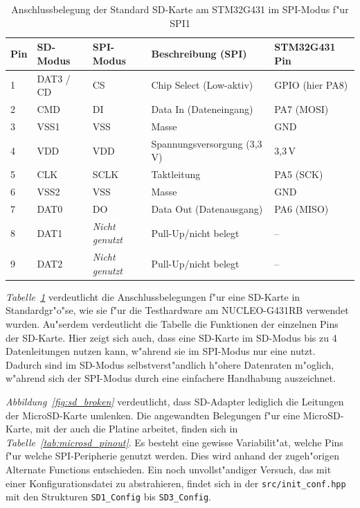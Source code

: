 \documentclass[11pt]{article}
\newcommand*{\tab}[1]{\textit{Tabelle~\ref{#1}}}
\newcommand*{\fig}[1]{\textit{Abbildung~\ref{#1}}}
\newcommand{\cpp}[1]{\texttt{#1}}
\begin{document}
\begin{table}[H]
    \centering
    \caption{Anschlussbelegung der Standard SD-Karte am STM32G431 im SPI-Modus f"ur SPI1}
    \label{tab:standardsd_spi}
    \begin{tabular}{lllll}
    \toprule
    \textbf{Pin} & \textbf{SD-Modus} & \textbf{SPI-Modus} & \textbf{Beschreibung (SPI)} & \textbf{STM32G431 Pin} \\ \midrule
    1            & DAT3 / CD         & CS        & Chip Select (Low-aktiv)     & GPIO (hier PA8)        \\
    2            & CMD               & DI        & Data In (Dateneingang)      & PA7 (MOSI)              \\
    3            & VSS1              & VSS       & Masse                       & GND                     \\
    4            & VDD               & VDD       & Spannungsversorgung (3,3\,V)    & 3,3\,V                  \\
    5            & CLK               & SCLK      & Taktleitung                 & PA5 (SCK)               \\
    6            & VSS2              & VSS       & Masse                       & GND                     \\
    7            & DAT0              & DO        & Data Out (Datenausgang)     & PA6 (MISO)              \\
    8            & DAT1              & \textit{Nicht genutzt} & Pull-Up/nicht belegt                & --                      \\
    9            & DAT2              & \textit{Nicht genutzt} & Pull-Up/nicht belegt                 & --                      \\ \bottomrule
    \end{tabular}
\end{table}

\tab{tab:standardsd_spi} verdeutlicht die Anschlussbelegungen f"ur eine SD-Karte in Standardgr"o"se, wie sie f"ur die Testhardware
am NUCLEO-G431RB verwendet wurden. Au"serdem verdeutlicht die Tabelle die Funktionen der einzelnen Pins der SD-Karte.
Hier zeigt sich auch, dass eine SD-Karte im SD-Modus bis zu 4 Datenleitungen nutzen kann, w"ahrend sie im SPI-Modus nur
eine nutzt. Dadurch sind im SD-Modus selbstverst"andlich h"ohere Datenraten m"oglich, w"ahrend sich der SPI-Modus
durch eine einfachere Handhabung auszeichnet.

\fig{fig:sd_broken} verdeutlicht, dass SD-Adapter lediglich die Leitungen der MicroSD-Karte umlenken.
Die angewandten Belegungen f"ur eine MicroSD-Karte, mit der auch die Platine arbeitet, finden sich in \tab{tab:microsd_pinout}.
Es besteht eine gewisse Variabilit"at, welche Pins f"ur welche SPI-Peripherie genutzt werden.
Dies wird anhand der zugeh"origen Alternate Functions entschieden. Ein noch unvollst"andiger Versuch, 
das mit einer Konfigurationsdatei zu abstrahieren, findet sich in der \texttt{src/init\_conf.hpp} mit den
Strukturen \cpp{SD1_Config} bis \cpp{SD3_Config}. 
\end{document}

